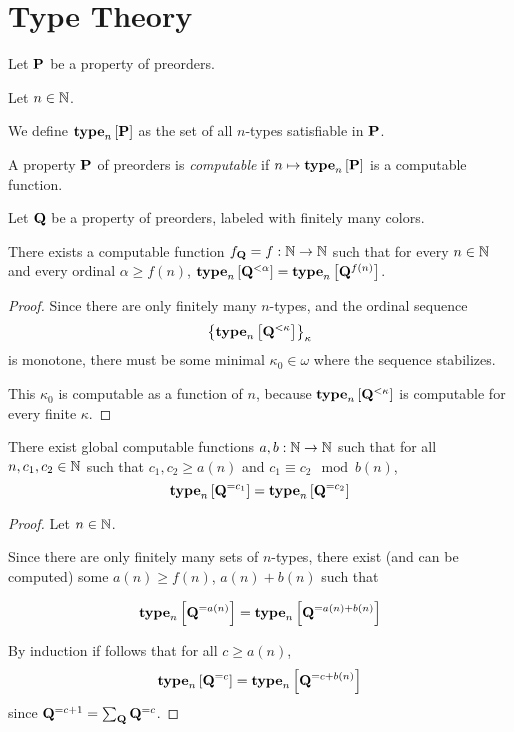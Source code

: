 \section{Type Theory}
\begin{definition}
    Let $\mathbf{P}$ be a property of preorders.

    Let $n \in \mathbb{N}$.

    We define $\mathbf{type}_{n} \left[ {\mathbf{P}} \right]$ as the set of all
    $n$-types satisfiable in $\mathbf{P}$.
\end{definition}

\begin{definition}
    A property $\mathbf{P}$ of preorders is \emph{computable} if
    $n \mapsto \mathbf{type}_{n} \left[ {\mathbf{P}} \right]$ is a computable function.
\end{definition}

\begin{lemma}\label{f-lemma}
    Let $\mathbf{Q}$ be a property of preorders,
    labeled with finitely many colors.

    There exists a computable function $f_{\mathbf{Q}} = f: \mathbb{N} \to \mathbb{N}$ such that
    for every $n \in \mathbb{N}$ and every ordinal $\alpha \ge f(n)$,
    $\mathbf{type}_{n} \left[ {\mathbf{Q}^{< \alpha}} \right] = \mathbf{type}_{n} \left[ {\mathbf{Q}^{f(n)}} \right]$.
\end{lemma}

\begin{proof}
    Since there are only finitely many $n$-types,
    and the ordinal sequence \[\left\{ {\mathbf{type}_{n} \left[ {\mathbf{Q}^{< \kappa}} \right]} \right\}_{\kappa}\]
    is monotone,
    there must be some minimal $\kappa_0 \in \omega$ where the sequence stabilizes.

    This $\kappa_0$ is computable as a function of $n$, because
    $\mathbf{type}_{n} \left[ {\mathbf{Q}^{< \kappa}} \right]$ is computable for every finite $\kappa$.
\end{proof}

\begin{lemma}\label{ab-lemma}
    There exist global computable functions $a, b : \mathbb{N} \to \mathbb{N}$ such that
    for all $n, c_1, c_2 \in \mathbb{N}$ such that $c_1, c_2 \ge a(n)$ and $c_1 \equiv c_2 \mod b(n)$,
    \[\mathbf{type}_{n} \left[ {\mathbf{Q}^{= c_1}} \right] = \mathbf{type}_{n} \left[ {\mathbf{Q}^{= c_2}} \right]\]
\end{lemma}

\begin{proof}
    Let $n \in \mathbb{N}$.

    Since there are only finitely many sets of $n$-types,
    there exist (and can be computed)
    some $a(n) \ge f(n)$, $a(n) + b(n)$ such that

    \[
        \mathbf{type}_{n} \left[ {\mathbf{Q}^{= a(n)}} \right] = \mathbf{type}_{n} \left[ {\mathbf{Q}^{= a(n) + b(n)}} \right]
    \]

    By induction if follows that for all $c \ge a(n)$,
    \[\mathbf{type}_{n} \left[ {\mathbf{Q}^{= c}} \right] = \mathbf{type}_{n} \left[ {\mathbf{Q}^{= c + b(n)}} \right]\]
    since $\mathbf{Q}^{= c + 1} = \sum_{\mathbf{Q}} \mathbf{Q}^{= c}$.
\end{proof}

